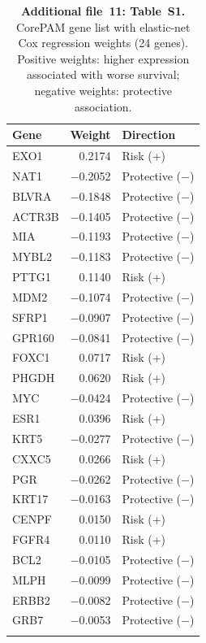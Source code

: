 \documentclass[referee,lineno,pdflatex,sn-vancouver-num]{sn-jnl}
\begin{document}
\begin{table}[h]
\caption{\textbf{Additional file~11: Table~S1.} CorePAM gene list with elastic-net Cox regression weights (24 genes). Positive weights: higher expression associated with worse survival; negative weights: protective association.}\label{tab:s1-weights}
\begin{tabular}{@{}lrl@{}}
\toprule
Gene & Weight & Direction \\
\midrule
EXO1 & 0.2174 & Risk (+) \\
NAT1 & $-$0.2052 & Protective ($-$) \\
BLVRA & $-$0.1848 & Protective ($-$) \\
ACTR3B & $-$0.1405 & Protective ($-$) \\
MIA & $-$0.1193 & Protective ($-$) \\
MYBL2 & $-$0.1183 & Protective ($-$) \\
PTTG1 & 0.1140 & Risk (+) \\
MDM2 & $-$0.1074 & Protective ($-$) \\
SFRP1 & $-$0.0907 & Protective ($-$) \\
GPR160 & $-$0.0841 & Protective ($-$) \\
FOXC1 & 0.0717 & Risk (+) \\
PHGDH & 0.0620 & Risk (+) \\
MYC & $-$0.0424 & Protective ($-$) \\
ESR1 & 0.0396 & Risk (+) \\
KRT5 & $-$0.0277 & Protective ($-$) \\
CXXC5 & 0.0266 & Risk (+) \\
PGR & $-$0.0262 & Protective ($-$) \\
KRT17 & $-$0.0163 & Protective ($-$) \\
CENPF & 0.0150 & Risk (+) \\
FGFR4 & 0.0110 & Risk (+) \\
BCL2 & $-$0.0105 & Protective ($-$) \\
MLPH & $-$0.0099 & Protective ($-$) \\
ERBB2 & $-$0.0082 & Protective ($-$) \\
GRB7 & $-$0.0053 & Protective ($-$) \\
\botrule
\end{tabular}
\end{table}
\end{document}
